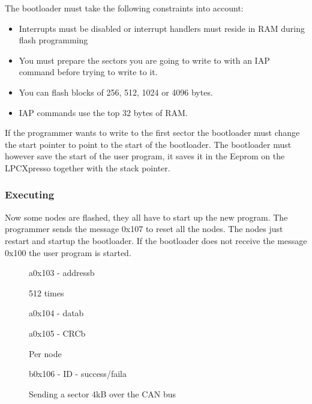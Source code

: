 \documentclass[twocolumn]{article}
\begin{document}
			The bootloader must take the following constraints into account:
			\begin{itemize}
				\item Interrupts must be disabled or interrupt handlers must reside in RAM during flash programming
				\item You must prepare the sectors you are going to write to with an IAP command before trying to write to it.
				\item You can flash blocks of 256, 512, 1024 or 4096 bytes.
				\item IAP commands use the top 32 bytes of RAM.
			\end{itemize}
			
			If the programmer wants to write to the first sector the bootloader must change the start pointer to point to the start of the bootloader.
			The bootloader must however save the start of the user program,
			it saves it in the Eeprom on the LPCXpresso together with the stack pointer.

		\subsubsection*{Executing}
			Now some nodes are flashed, they all have to start up the new program.
			The programmer sends the message 0x107 to reset all the nodes.
			The nodes just restart and startup the bootloader.
			If the bootloader does not receive the message 0x100 the user program is started.
	
			\begin{figure}[t]
				\centering
				\begin{sequencediagram}
					
					\begin{call}{a}{0x103 - address}{b}{} %
					\end{call}
					\begin{sdloop}{512 times}
						\begin{call}{a}{0x104 - data}{b}{} %
						\end{call}
					\end{sdloop}
					\begin{call}{a}{0x105 - CRC}{b}{} %
						\begin{sdloop}{Per node}
							\begin{call}{b}{0x106 - ID - success/fail}{a}{} %
							\end{call}
						\end{sdloop}
					\end{call}
				
				\end{sequencediagram}
				\caption{Sending a sector 4kB over the CAN bus}
			\end{figure}
		
\end{document}
